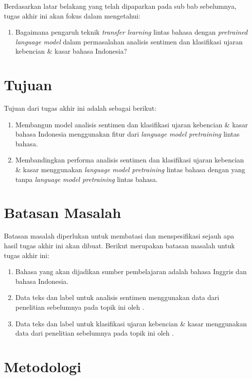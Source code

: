 Berdasarkan latar belakang yang telah dipaparkan pada sub bab sebelumnya, tugas akhir ini akan fokus dalam mengetahui: 
\begin{enumerate}
	\item Bagaimana pengaruh teknik \textit{transfer learning} lintas bahasa dengan \textit{pretrained language model} dalam permasalahan analisis sentimen dan klasifikasi ujaran kebencian \& kasar bahasa Indonesia?
\end{enumerate}

\section{Tujuan}

Tujuan dari tugas akhir ini adalah sebagai berikut:
\begin{enumerate}
	\item Membangun model analisis sentimen dan klasifikasi ujaran kebencian \& kasar bahasa Indonesia menggunakan fitur dari \textit{language model pretraining} lintas bahasa.
	\item Membandingkan performa analisis sentimen dan klasifikasi ujaran kebencian \& kasar menggunakan \textit{language model pretraining} lintas bahasa dengan yang tanpa \textit{language model pretraining} lintas bahasa.
\end{enumerate}

\section{Batasan Masalah}

Batasan masalah diperlukan untuk membatasi dan menspesifikasi sejauh apa hasil tugas akhir ini akan dibuat. Berikut merupakan batasan masalah untuk tugas akhir ini:
\begin{enumerate}
	\item Bahasa yang akan dijadikan sumber pembelajaran adalah bahasa Inggris dan bahasa Indonesia.
	\item Data teks dan label untuk analisis sentimen menggunakan data dari penelitian sebelumnya pada topik ini oleh \parencite{CrisdayantiPurwarianti2019}.
	\item Data teks dan label untuk klasifikasi ujaran kebencian \& kasar menggunakan data dari penelitian sebelumnya pada topik ini oleh \parencite{Ibrohim_Budi_2019}.
\end{enumerate}

\section{Metodologi}

